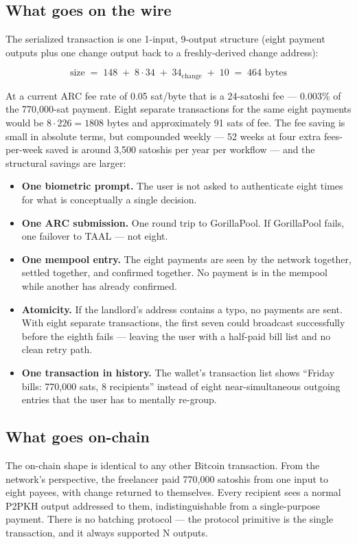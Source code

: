\documentclass[a4paper, 11pt]{article}
\begin{document}
\subsection{What goes on the wire}

The serialized transaction is one 1-input, 9-output structure (eight payment outputs plus one change output back to a freshly-derived change address):

\[ \text{size} \;=\; 148 \;+\; 8 \cdot 34 \;+\; 34_{\text{change}} \;+\; 10 \;=\; 464 \text{ bytes} \]

At a current ARC fee rate of 0.05 sat/byte that is a 24-satoshi fee --- 0.003\% of the 770{,}000-sat payment. Eight separate transactions for the same eight payments would be $8 \cdot 226 = 1808$ bytes and approximately 91 sats of fee. The fee saving is small in absolute terms, but compounded weekly --- 52 weeks at four extra fees-per-week saved is around 3{,}500 satoshis per year per workflow --- and the structural savings are larger:

\begin{itemize}
\item \textbf{One biometric prompt.} The user is not asked to authenticate eight times for what is conceptually a single decision.
\item \textbf{One ARC submission.} One round trip to GorillaPool. If GorillaPool fails, one failover to TAAL --- not eight.
\item \textbf{One mempool entry.} The eight payments are seen by the network together, settled together, and confirmed together. No payment is in the mempool while another has already confirmed.
\item \textbf{Atomicity.} If the landlord's address contains a typo, no payments are sent. With eight separate transactions, the first seven could broadcast successfully before the eighth fails --- leaving the user with a half-paid bill list and no clean retry path.
\item \textbf{One transaction in history.} The wallet's transaction list shows ``Friday bills: 770{,}000 sats, 8 recipients'' instead of eight near-simultaneous outgoing entries that the user has to mentally re-group.
\end{itemize}

\subsection{What goes on-chain}

The on-chain shape is identical to any other Bitcoin transaction. From the network's perspective, the freelancer paid 770{,}000 satoshis from one input to eight payees, with change returned to themselves. Every recipient sees a normal P2PKH output addressed to them, indistinguishable from a single-purpose payment. There is no batching protocol --- the protocol primitive is the single transaction, and it always supported N outputs.
\end{document}
